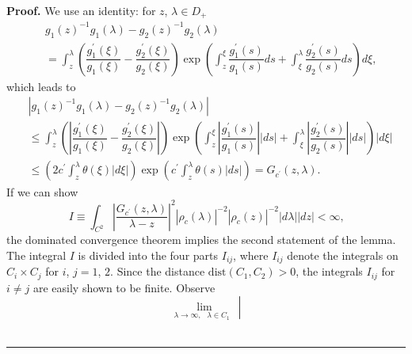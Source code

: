 \documentclass[a4paper]{article}%
\newenvironment{proof}[1][Proof]{\noindent\textbf{#1.} }{\ \rule{0.5em}{0.5em}}
\begin{document}
\begin{proof}
We use an identity: for $z$, $\lambda\in D_{+}$
\begin{align*}
&  g_{1}\left(  z\right)  ^{-1}g_{1}\left(  \lambda\right)  -g_{2}\left(
z\right)  ^{-1}g_{2}\left(  \lambda\right) \\
&  =\int_{z}^{\lambda}\left(  \dfrac{g_{1}^{\prime}\left(  \xi\right)  }%
{g_{1}\left(  \xi\right)  }-\dfrac{g_{2}^{\prime}\left(  \xi\right)  }%
{g_{2}\left(  \xi\right)  }\right)  \exp\left(  \int_{z}^{\xi}\dfrac
{g_{1}^{\prime}\left(  s\right)  }{g_{1}\left(  s\right)  }ds+\int_{\xi
}^{\lambda}\dfrac{g_{2}^{\prime}\left(  s\right)  }{g_{2}\left(  s\right)
}ds\right)  d\xi\text{,}%
\end{align*}
which leads to%
\begin{align*}
&  \left\vert g_{1}\left(  z\right)  ^{-1}g_{1}\left(  \lambda\right)
-g_{2}\left(  z\right)  ^{-1}g_{2}\left(  \lambda\right)  \right\vert \\
&  \leq\int_{z}^{\lambda}\left(  \left\vert \dfrac{g_{1}^{\prime}\left(
\xi\right)  }{g_{1}\left(  \xi\right)  }-\dfrac{g_{2}^{\prime}\left(
\xi\right)  }{g_{2}\left(  \xi\right)  }\right\vert \right)  \exp\left(
\int_{z}^{\xi}\left\vert \dfrac{g_{1}^{\prime}\left(  s\right)  }{g_{1}\left(
s\right)  }\right\vert \left\vert ds\right\vert +\int_{\xi}^{\lambda
}\left\vert \dfrac{g_{2}^{\prime}\left(  s\right)  }{g_{2}\left(  s\right)
}\right\vert \left\vert ds\right\vert \right)  \left\vert d\xi\right\vert \\
&  \leq\left(  2c^{\prime}\int_{z}^{\lambda}\theta\left(  \xi\right)
\left\vert d\xi\right\vert \right)  \exp\left(  c^{\prime}\int_{z}^{\lambda
}\theta\left(  s\right)  \left\vert ds\right\vert \right)  =G_{c^{\prime}%
}\left(  z,\lambda\right)  \text{.}%
\end{align*}
If we can show%
\[
I\equiv\int_{C^{2}}\left\vert \dfrac{G_{c^{\prime}}\left(  z,\lambda\right)
}{\lambda-z}\right\vert ^{2}\left\vert \rho_{c}\left(  \lambda\right)
\right\vert ^{-2}\left\vert \rho_{c}\left(  z\right)  \right\vert
^{-2}\left\vert d\lambda\right\vert \left\vert dz\right\vert <\infty\text{,}%
\]
the dominated convergence theorem implies the second statement of the lemma.
The integral $I$ is divided into the four parts $I_{ij}$, where $I_{ij}$
denote the integrals on $C_{i}\times C_{j}$ for $i$, $j=1$, $2$. Since the
distance $\mathrm{dist}\left(  C_{1},C_{2}\right)  >0$, the integrals $I_{ij}$
for $i\neq j$ are easily shown to be finite. Observe%
\[
\lim_{\lambda\rightarrow\infty,\text{ }\lambda\in C_{1}\text{ }}\left\vert
\]
\end{proof}
\end{document}
